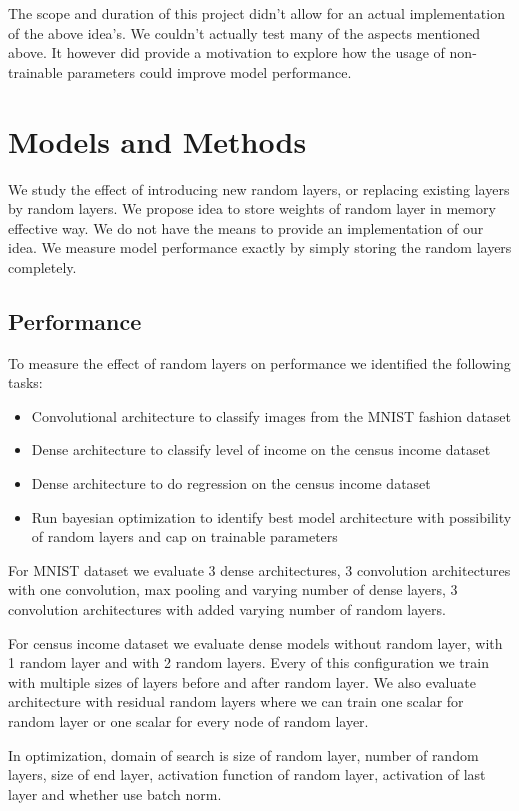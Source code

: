 \documentclass[]{article}
\begin{document}
\begin{multicols}{2}
	The scope and duration of this project didn't allow for an actual implementation of the above idea's. We couldn't actually test many of the aspects mentioned above. It however did provide a motivation to explore how the usage of non-trainable parameters could improve model performance.
	
	\section{Models and Methods}
	We study the effect of introducing new random layers, or replacing existing layers by random layers. We propose idea to store weights of random layer in memory effective way. We do not have the means to provide an implementation of our idea. We measure model performance exactly by simply storing the random layers completely.
	
	\subsection{Performance}
	To measure the effect of random layers on performance we identified the following tasks:
	\begin{itemize}
		\itemsep0em
		\item Convolutional architecture to classify images from the MNIST fashion dataset
		\item Dense architecture to classify level of income on the census income dataset
		\item Dense architecture to do regression on the census income dataset
		\item Run bayesian optimization to identify best model architecture with possibility of random layers and cap on trainable parameters
	\end{itemize}
	For MNIST dataset we evaluate 3 dense architectures, 3 convolution architectures with one convolution, max pooling and varying number of dense layers, 3 convolution architectures with added varying number of random layers.

	For census income dataset we evaluate dense models without random layer, with 1 random layer and with 2 random layers. Every of this configuration we train with multiple sizes of layers before and after random layer. We also evaluate architecture with residual random layers where we can train one scalar for random layer or one scalar for every node of random layer.
	
	In optimization, domain of search is size of random layer, number of random layers, size of end layer, activation function of random layer, activation of last layer and whether use batch norm.	
	

\end{multicols}
\end{document}
